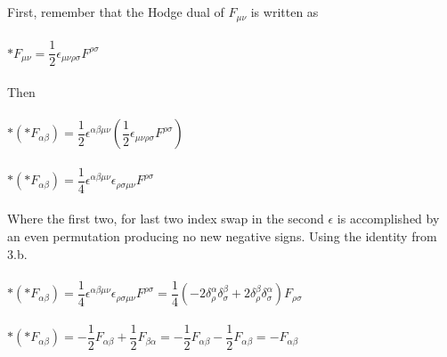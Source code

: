 \documentclass[prb,preprint]
{revtex4-1}
\begin{document}
\\
\\
First, remember that the Hodge dual of $F_{\mu\nu}$ is written as 
\\
\\
$*F_{\mu\nu} = \dfrac{1}{2} \epsilon_{\mu\nu\rho\sigma} F^{\rho\sigma}$
\\
\\
Then
\\
\\
$*\left(*F_{\alpha\beta}\right) = \dfrac{1}{2} \epsilon^{\alpha\beta\mu\nu} \left(\dfrac{1}{2} \epsilon_{\mu\nu\rho\sigma} F^{\rho\sigma}\right)$
\\
\\
$*\left(*F_{\alpha\beta}\right) = \dfrac{1}{4} \epsilon^{\alpha\beta\mu\nu}\epsilon_{\rho\sigma\mu\nu} F^{\rho\sigma}$
\\
\\
Where the first two, for last two index swap in the second $\epsilon$ is accomplished by an even permutation producing no new negative signs.  Using the identity from 3.b.
\\
\\
$*\left(*F_{\alpha\beta}\right) = \dfrac{1}{4} \epsilon^{\alpha\beta\mu\nu}\epsilon_{\rho\sigma\mu\nu} F^{\rho\sigma} = \dfrac{1}{4} \left(-2\delta^\alpha_\rho \delta^\beta_\sigma + 2\delta^\beta_\rho \delta^\alpha_\sigma \right) F_{\rho\sigma}$
\\
\\
$*\left(*F_{\alpha\beta}\right) = -\dfrac{1}{2} F_{\alpha\beta} + \dfrac{1}{2} F_{\beta\alpha} = -\dfrac{1}{2} F_{\alpha\beta} - \dfrac{1}{2} F_{\alpha\beta} = -F_{\alpha\beta}$
\\
\\


\end{document}
